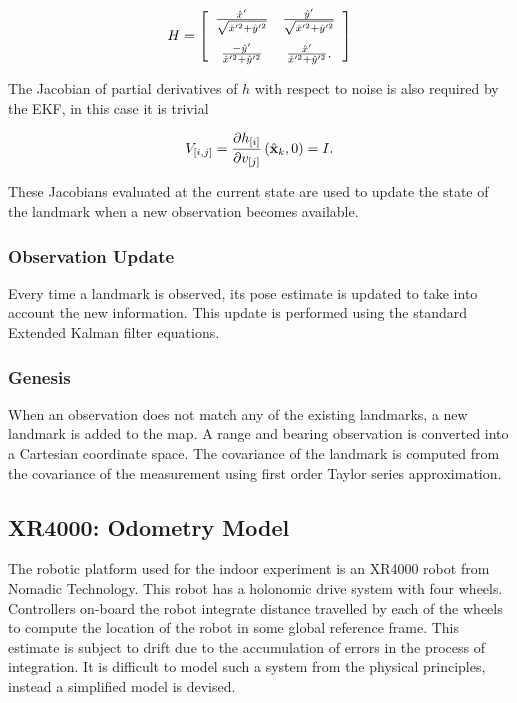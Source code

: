 $$
H = 
 \left[ \begin {array}{cc}
   \frac{\hat{x}'}{ \sqrt{\hat{x}'^2+\hat{y}'^2} } & 
   \frac{\hat{y}'}{ \sqrt{\hat{x}'^2+\hat{y}'^2} } \\ \noalign{\medskip}
   \frac{-\hat{y}'}{ \hat{x}'^2+\hat{y}'^2 } & 
   \frac{ \hat{x}'}{ \hat{x}'^2+\hat{y}'^2 }.
\end{array} \right] 
$$

The Jacobian of partial derivatives of $h$ with respect
to noise is also required by the EKF, in this case it is trivial

$$
V_{[i,j]} = \frac{\partial h_{[i]}}{\partial v_{[j]}}
             \left(\hat{\bf x}_k , 0 \right) = I.
$$

These Jacobians evaluated at the current state are used to update the
state of the landmark when a new observation becomes available.


\subsubsection{Observation Update}

Every time a landmark is observed, its pose estimate is updated to
take into account the new information. This update is performed using
the standard Extended Kalman filter equations.


\subsubsection{Genesis}

When an observation does not match any of the existing landmarks, a
new landmark is added to the map. A range and bearing observation is
converted into a Cartesian coordinate space. The covariance of the
landmark is computed from the covariance of the measurement using
first order Taylor series approximation.


\subsection{XR4000: Odometry Model}

The robotic platform used for the indoor experiment is an XR4000 robot
from Nomadic Technology. This robot has a holonomic drive system with
four wheels. Controllers on-board the robot integrate distance
travelled by each of the wheels to compute the location of the robot
in some global reference frame. This estimate is subject to drift
due to the accumulation of errors in the process of integration. It is
difficult to model such a system from the physical principles, instead
a simplified model is devised.

